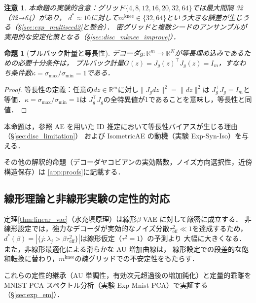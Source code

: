 \documentclass[11pt,a4paper]{jsarticle}
\newtheorem{proposition}{命題}
\newtheorem{remark}{注意}
\newcommand{\Jg}{J_g}
\newcommand{\R}{\mathbb{R}}
\newcommand{\kap}{\kappa}
\newcommand{\mknee}{m^{\mathrm{knee}}}
\begin{document}
\begin{remark}
本命題の実験的含意：グリッド$\{4,8,12,16,20,32,64\}$では最大間隔 32（32→64）があり，
$d^* \approx 10$に対して$\mknee \in \{32, 64\}$という大きな誤差が生じうる（§\ref{sec:exp_multiseed2}と整合）．
密グリッドと複数シードのアンサンブルが実用的な安定化策となる（§\ref{sec:disc_mknee_improve}）．
\end{remark}

\begin{proposition}[プルバック計量と等長性]\label{thm:pullback}
デコーダ$g: \R^m \to \R^N$が等長埋め込みであるための必要十分条件は，
プルバック計量$G(z) = \Jg(z)^\top \Jg(z) = I_m$，すなわち条件数$\kap = \sigma_{\max}/\sigma_{\min} = 1$である．
\end{proposition}

\begin{proof}
等長性の定義：任意の$dz \in \R^m$に対し$\|J_g dz\|^2 = \|dz\|^2$は
$J_g^\top J_g = I_m$と等価．$\kap = \sigma_{\max}/\sigma_{\min} = 1$は
$J_g^\top J_g$の全特異値が1であることを意味し，等長性と同値．
\end{proof}

本命題は，参照 AE を用いた ID 推定において等長性バイアスが生じる理由（§\ref{sec:disc_limitation}）
および IsometricAE の動機（実験 Exp-Syn-Iso）を与える．

その他の解釈的命題（デコーダヤコビアンの実効階数，ノイズ方向選択性，近傍構造保存）は
\ref{app:proofs}に記載する．

\subsection{線形理論と非線形実験の定性的対応}\label{sec:theory_bridge}

定理\ref{thm:linear_vae}（水充填原理）は線形$\beta$-VAE に対して厳密に成立する．
非線形設定では，強力なデコーダが実効的なノイズ分散$\tau^2_\mathrm{eff} \ll 1$を達成するため，
$d^*(\beta) = |\{j : \lambda_j > \beta\tau^2_\mathrm{eff}\}|$は線形仮定（$\tau^2=1$）の予測より
大幅に大きくなる．また，非線形最適化による滑らかな AU 増加曲線は，
線形設定での段差的な飽和転換に替わり，$\mknee$の疎グリッドでの不安定性をもたらす．

これらの定性的継承（AU 単調性，有効次元超過後の増加鈍化）と定量的乖離を
MNIST PCA スペクトル分析（実験 Exp-Mnist-PCA）で実証する（§\ref{sec:exp_em}）．
\end{document}
